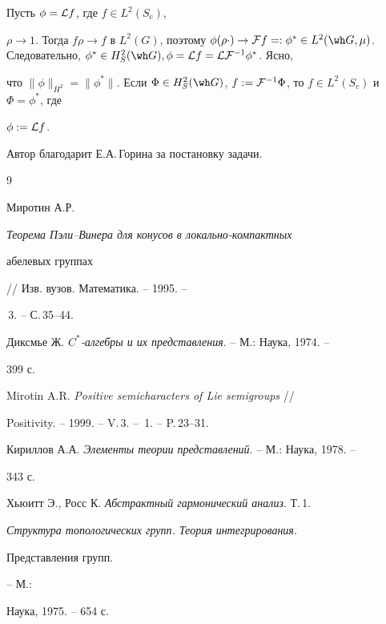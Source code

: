 \begin{pf}


Пусть $\phi={\cal L}f$, где $f\in L^2(S_c)$,


$\rho\to 1$. Тогда $f\rho\to f$ в $L^2(G)$, поэтому $\phi(\rho\cdot)\to


{\cal F}f=:\phi^*\in L^2(\wh G,\mu)$. Следовательно, $\phi^*\in


H^2_S(\wh G),\phi={\cal L}f={\cal L}{\cal F}^{-1}\phi^*$. Ясно,


что $\|\phi\|_{H^2}=\|\phi^*\|$. Если $\Phi\in H^2_S(\wh G)$, $f:=


{\cal F}^{-1}\Phi$, то $f\in L^2(S_c)$ и $\Phi=\phi^*$, где


$\phi:={\cal L}f$.


\end{pf}





Автор благодарит Е.А.\,Горина за постановку задачи.





\begin{thebibliography}{9}







Миротин А.Р. {\em Теорема Пэли--Винера для конусов в локально-компактных


абелевых группах} // Изв. вузов. Математика. -- 1995. --


\No\,3. -- С.\,35--44.




Диксмье Ж. {\em $C^*$-алгебры и их представления}. -- М.: Наука, 1974. --


399 с.




Mirotin A.R. {\em Positive semicharacters of Lie semigroups} //


Positivity. -- 1999. -- V.\,3. -- \No\,1. -- P.\,23--31.




Кириллов А.А. {\em Элементы теории представлений}. -- М.: Наука, 1978. --


343 с.




Хьюитт Э., Росс К. {\em Абстрактный гармонический анализ}. Т.\,1.


{\em Структура топологических групп. Теория интегрирования.


Представления групп.} -- М.:


Наука, 1975. -- 654 с.





\end{thebibliography}





\vskip 2cm












\label{end}






